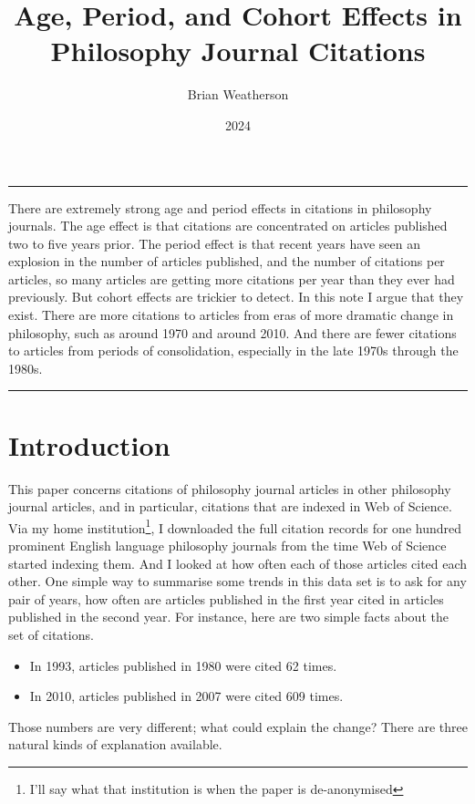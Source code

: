 \documentclass[
  10pt,
  letterpaper,
  DIV=11,
  numbers=noendperiod,
  twoside]{scrartcl}
\title{Age, Period, and Cohort Effects in Philosophy Journal Citations}
\author{Brian Weatherson}
\date{2024}
\providecommand{\tightlist}{%
  \setlength{\itemsep}{0pt}\setlength{\parskip}{0pt}}\usepackage{longtable,booktabs,array}
\renewenvironment{abstract}
 {\vspace{-1.25cm}
 \quotation\small\noindent\rule{\linewidth}{.5pt}\par\smallskip
 \noindent }
 {\par\noindent\rule{\linewidth}{.5pt}\endquotation}
\begin{document}
\maketitle
\begin{abstract}
There are extremely strong age and period effects in citations in
philosophy journals. The age effect is that citations are concentrated
on articles published two to five years prior. The period effect is that
recent years have seen an explosion in the number of articles published,
and the number of citations per articles, so many articles are getting
more citations per year than they ever had previously. But cohort
effects are trickier to detect. In this note I argue that they exist.
There are more citations to articles from eras of more dramatic change
in philosophy, such as around 1970 and around 2010. And there are fewer
citations to articles from periods of consolidation, especially in the
late 1970s through the 1980s.
\end{abstract}


\section{Introduction}\label{sec-introduction}

This paper concerns citations of philosophy journal articles in other
philosophy journal articles, and in particular, citations that are
indexed in Web of Science. Via my home institution\footnote{I'll say
  what that institution is when the paper is de-anonymised}, I
downloaded the full citation records for one hundred prominent English
language philosophy journals from the time Web of Science started
indexing them. And I looked at how often each of those articles cited
each other. One simple way to summarise some trends in this data set is
to ask for any pair of years, how often are articles published in the
first year cited in articles published in the second year. For instance,
here are two simple facts about the set of citations.

\begin{itemize}
\tightlist
\item
  In 1993, articles published in 1980 were cited 62 times.
\item
  In 2010, articles published in 2007 were cited 609 times.
\end{itemize}

Those numbers are very different; what could explain the change? There
are three natural kinds of explanation available.
\end{document}
